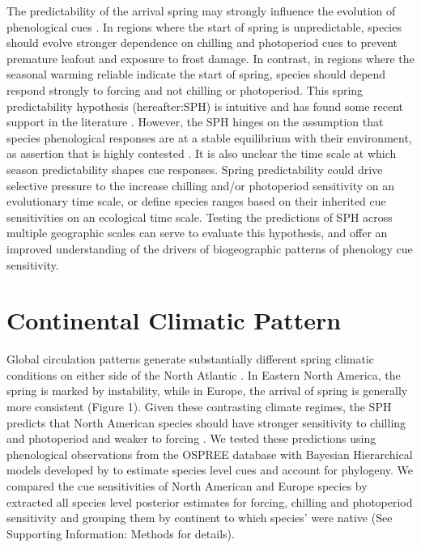 \documentclass[12pt]{article}
\begin{document}
The predictability of the arrival spring may strongly influence the evolution of phenological cues \citep{Zohner:2017aa,Zohner:2017ua,Dawson2025}. In regions where the start of spring is unpredictable, species should evolve stronger dependence on chilling and photoperiod cues to prevent premature leafout and exposure to frost damage. In contrast, in regions where the seasonal warming reliable indicate the start of spring, species should depend respond strongly to forcing and not chilling or photoperiod. This spring predictability hypothesis (hereafter:SPH) is intuitive and has found some recent support in the literature \citep{Zohner:2017aa}. However, the SPH hinges on the assumption that species phenological responses are at a stable equilibrium with their environment, as assertion that is highly contested \citep{}. It is also unclear the time scale at which season predictability shapes cue responses. Spring predictability could drive selective pressure to the increase chilling and/or photoperiod sensitivity on an evolutionary time scale, or define species ranges based on their inherited cue sensitivities on an ecological time scale. Testing the predictions of SPH across multiple geographic scales can serve to evaluate this hypothesis, and offer an improved understanding of the drivers of biogeographic patterns of phenology cue sensitivity.

\section*{Continental Climatic Pattern}

Global circulation patterns generate substantially different spring climatic conditions on either side of the North Atlantic \citep{}. In Eastern North America, the spring is marked by instability, while in Europe, the arrival of spring is generally more consistent (Figure 1). Given these contrasting climate regimes, the SPH predicts that North American species should have stronger sensitivity to chilling and photoperiod and weaker to forcing \citep{Dawson Glass}. We tested these predictions using phenological observations from the OSPREE database \citep{} with Bayesian Hierarchical models developed by \citet{Nacho} to estimate species level cues and account for phylogeny. We compared the cue sensitivities of North American and Europe species by extracted all species level posterior estimates for forcing, chilling and photoperiod sensitivity and grouping them by continent to which species' were native (See Supporting Information: Methods for details).
\end{document}
